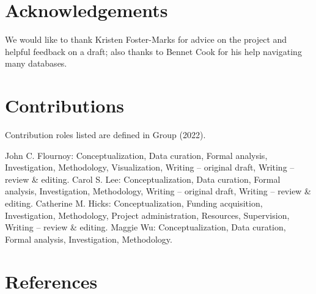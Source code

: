 \documentclass[
]{article}
\begin{document}
\section{Acknowledgements}\label{acknowledgements}

We would like to thank Kristen Foster-Marks for advice on the project
and helpful feedback on a draft; also thanks to Bennet Cook for his help
navigating many databases.

\section{Contributions}\label{contributions}

Contribution roles listed are defined in Group (2022).

John C. Flournoy: Conceptualization, Data curation, Formal analysis,
Investigation, Methodology, Visualization, Writing -- original draft,
Writing -- review \& editing. Carol S. Lee: Conceptualization, Data
curation, Formal analysis, Investigation, Methodology, Writing --
original draft, Writing -- review \& editing. Catherine M. Hicks:
Conceptualization, Funding acquisition, Investigation, Methodology,
Project administration, Resources, Supervision, Writing -- review \&
editing. Maggie Wu: Conceptualization, Data curation, Formal analysis,
Investigation, Methodology.

\section*{References}\label{references}
\end{document}
